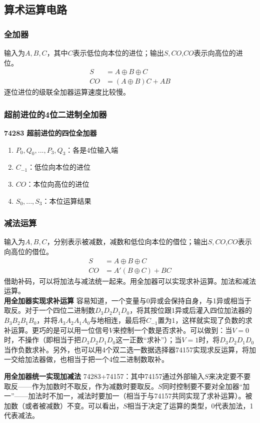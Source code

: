 \documentclass{ctexart}
\newcommand*{\noindbf}[1]{{\noindent \bf{#1} \qquad}}
\begin{document}
\subsection{算术运算电路}
\subsubsection{全加器}
输入为$A,B,C$，其中$C$表示低位向本位的进位；输出$S,CO$,$CO$表示向高位的进位。
\begin{align}
    S&=A\oplus B \oplus C\\
    CO&=(A\oplus B)C+AB
\end{align}
逐位进位的级联全加器运算速度比较慢。
\subsubsection{超前进位的4位二进制全加器}
\noindbf{74283 超前进位的四位全加器}
\begin{enumerate}
    \item $P_0,Q_0,...,P_3,Q_3$：各是4位输入端
    \item $C_{-1}$：低位向本位的进位
    \item $CO$：本位向高位的进位
    \item $S_0,...,S_3$：本位运算结果
\end{enumerate}
\subsubsection{减法运算}
输入为$A,B,C$，分别表示被减数，减数和低位向本位的借位；输出$S,CO$,$CO$表示向高位的借位。
\begin{align}
    S&=A\oplus B \oplus C\\
    CO&=A'(B\oplus C)+BC
\end{align}
借助补码，可以将加法与减法统一起来。用全加器可以实现求补运算。加法和减法运算。\\
\noindbf{用全加器实现求补运算}容易知道，一个变量与0异或会保持自身，与1异或相当于取反。对于一个四位二进制数$D_3D_2D_1D_0$，将其按位跟1异或后灌入四位加法器的$B_3B_2B_1B_0$，并将$A_3A_2A_1A_0$与地相连，最后将$C_{-1}$置为1，这样就实现了负数的求补运算。更巧的是可以用一位信号$V$来控制一个数是否求补。可以做到：当$V=0$时，不操作（即相当于把$D_3D_2D_1D_0$这一正数“求补”）；当$V=1$时，将$D_3D_2D_1D_0$当作负数求补。另外，也可以用4个双二选一数据选择器74157实现求反运算，将加一交给加法器做，也相当于把一个4位二进制数取补。

\noindbf{用全加器统一实现加减法}
74283+74157：其中74157通过外部输入$S$来决定要不要取反——作为加数时不取反，作为减数时要取反。$S$同时控制要不要对全加器“加一”——加法时不加一，减法时要加一（相当于与74157共同实现了求补运算）。被加数（或者被减数）不变。可以看出，$S$相当于决定了运算的类型，0代表加法，1代表减法。
\end{document}
